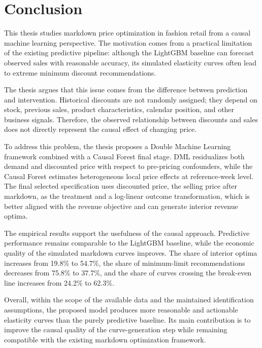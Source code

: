 \chapter{Conclusion}

\label{Chapter6}

This thesis studies markdown price optimization in fashion retail from a causal machine learning perspective. The motivation comes from a practical limitation of the existing predictive pipeline: although the LightGBM baseline can forecast observed sales with reasonable accuracy, its simulated elasticity curves often lead to extreme minimum discount recommendations.

The thesis argues that this issue comes from the difference between prediction and intervention. Historical discounts are not randomly assigned; they depend on stock, previous sales, product characteristics, calendar position, and other business signals. Therefore, the observed relationship between discounts and sales does not directly represent the causal effect of changing price.

To address this problem, the thesis proposes a Double Machine Learning framework combined with a Causal Forest final stage. DML residualizes both demand and discounted price with respect to pre-pricing confounders, while the Causal Forest estimates heterogeneous local price effects at reference-week level. The final selected specification uses discounted price, the selling price after markdown, as the treatment and a log-linear outcome transformation, which is better aligned with the revenue objective and can generate interior revenue optima.

The empirical results support the usefulness of the causal approach. Predictive performance remains comparable to the LightGBM baseline, while the economic quality of the simulated markdown curves improves. The share of interior optima increases from 19.8\% to 54.7\%, the share of minimum-limit recommendations decreases from 75.8\% to 37.7\%, and the share of curves crossing the break-even line increases from 24.2\% to 62.3\%.

Overall, within the scope of the available data and the maintained identification assumptions, the proposed model produces more reasonable and actionable elasticity curves than the purely predictive baseline. Its main contribution is to improve the causal quality of the curve-generation step while remaining compatible with the existing markdown optimization framework.